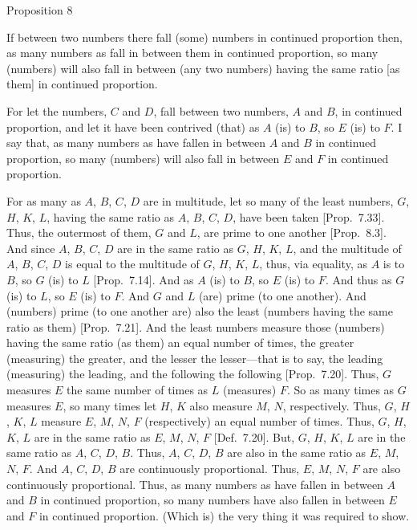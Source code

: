 \begin{center}
{\large Proposition 8}
\end{center}

If between two numbers there fall (some) numbers in continued proportion then, as many  numbers as fall in between them in continued proportion, so many (numbers)  will also fall in between (any two numbers) having the same ratio [as them] in continued  proportion.

\epsfysize=2.2in
\centerline{}

For let the numbers, $C$ and $D$,
 fall between two numbers, $A$ and $B$, in continued proportion, and let it have been contrived
(that) as $A$ (is) to $B$, so $E$ (is) to $F$. I say that, as many numbers  as have fallen in between $A$ and $B$ in continued proportion, so many (numbers)  will also fall in between $E$ and $F$ in continued proportion.

For as many  as $A$, $B$, $C$, $D$ are in multitude, let so many
of the least numbers, $G$, $H$, $K$, $L$, having the
same ratio as $A$, $B$, $C$, $D$, have been taken [Prop.~7.33]. Thus, the outermost of them, $G$ and
$L$, are prime to one another [Prop.~8.3].
And since $A$, $B$, $C$, $D$ are in the same ratio as $G$, $H$, $K$, $L$,
and the multitude of $A$, $B$, $C$, $D$ is equal to the
multitude of $G$, $H$, $K$, $L$, thus, via equality, as $A$ is to $B$,
so $G$ (is) to $L$ [Prop.~7.14].
And as $A$ (is) to $B$, so $E$ (is) to $F$. And thus as $G$ (is) to $L$,
so $E$ (is) to $F$. And $G$ and $L$ (are) prime (to one another). And (numbers) prime (to one another are) also the least (numbers having the same ratio as them) [Prop.~7.21]. And the least numbers measure
those (numbers) having the same ratio (as them) an equal number of times, the greater (measuring) the greater, and the lesser the lesser---that is to say, the leading (measuring) the leading, and the following the following [Prop.~7.20]. Thus, $G$ measures $E$ the same
number of times as $L$ (measures) $F$. So as many times as $G$ measures $E$, so many times let $H$, $K$ also measure  $M$, $N$, respectively.
Thus, $G$, $H$, $K$, $L$  measure $E$, $M$, $N$, $F$ (respectively) an equal
number of times. Thus, $G$, $H$, $K$, $L$ are in the same
ratio as $E$, $M$, $N$, $F$ [Def.~7.20]. But,
$G$, $H$, $K$, $L$ are in the same ratio as $A$, $C$, $D$, $B$. 
Thus, $A$, $C$, $D$, $B$ are also in the same ratio as $E$, $M$, $N$, $F$.
And $A$, $C$, $D$, $B$ are continuously proportional. Thus, $E$, $M$, 
$N$, $F$  are also continuously proportional. Thus, as many numbers  as have fallen in between $A$ and $B$ in
continued proportion, so many
numbers  have also fallen in between $E$ and $F$ in continued proportion.
(Which is) the very thing it was required to show.

